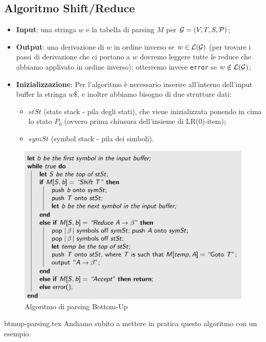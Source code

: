 \documentclass[class=book, crop=false, oneside, 12pt]{standalone}
\begin{document}
\subsection{Algoritmo Shift/Reduce}
\begin{itemize}
    \item \textbf{Input}: una stringa \(w\) e la tabella di parsing \(M\) per \(\mathcal{G} = (V, T, S, \mathcal{P})\);
    \item \textbf{Output}: una derivazione di \(w\) in ordine inverso se \(w \in \mathcal{L}(\mathcal{G})\) (per trovare i passi di derivazione che ci portano a \(w\) dovremo leggere tutte le reduce che abbiamo applivato in ordine inverso); otterremo invece \texttt{error} se \(w \notin \mathcal{L}(\mathcal{G})\);
    \item \textbf{Inizializzazione}: Per l'algoritmo è necessario inserire all'interno dell'input buffer la stringa \(w\$\), e inoltre abbiamo bisogno di due strutture dati:
    \begin{itemize}
        \item \(stSt\) (state stack - pila degli stati), che viene inizializzata ponendo in cima lo stato \(P_0\) (ovvero prima chiusura dell'insieme di LR(0)-item);
        \item \(symSt\) (symbol stack - pila dei simboli).
    \end{itemize}
\end{itemize}

\begin{figure}
    \centering
    \includegraphics[width=.8\textwidth]{bottom-up-parsing-algorithm.png}
    \caption{Algoritmo di parsing Bottom-Up}
    \label{fig:bottom-up-parsing-algorithm}    
\end{figure}
{btmup-parsing.tex}
Andiamo subito a mettere in pratica questo algoritmo con un esempio.
\end{document}
